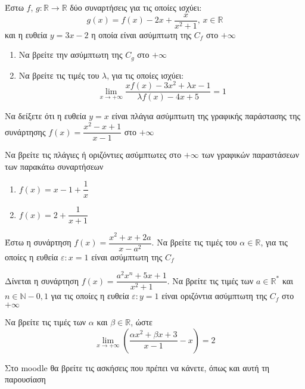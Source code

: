 \documentclass{presentation}
\begin{document}
\begin{askisi}
    Έστω $f$, $g:\mathbb{R}\to\mathbb{R}$ δύο συναρτήσεις για τις οποίες ισχύει:
    $$g(x)=f(x)-2x+\dfrac{x}{x^2+1} \text{, } x\in\mathbb{R}$$
    και η ευθεία $y=3x-2$ η οποία είναι ασύμπτωτη της $C_f$ στο $+\infty$
    \begin{enumerate}
        \item<1-> Να βρείτε την ασύμπτωτη της $C_g$ στο $+\infty$
        \item<2-> Να βρείτε τις τιμές του $λ$, για τις οποίες ισχύει:
            $$\lim\limits_{x \to +\infty}{ \dfrac{xf(x)-3x^2+λx-1}{λf(x)-4x+5} }=1$$
    \end{enumerate}

\end{askisi}

\begin{askisi}
    Να δείξετε ότι η ευθεία $y=x$ είναι πλάγια ασύμπτωτη της γραφικής παράστασης της συνάρτησης $f(x)=\dfrac{x^2-x+1}{x-1}$ στο $+\infty$

\end{askisi}

\begin{askisi}
    Να βρείτε τις πλάγιες ή οριζόντιες ασύμπτωτες στο $+\infty$ των γραφικών παραστάσεων των παρακάτω συναρτήσεων
    \begin{enumerate}
        \item<1-> $f(x)=x-1+\dfrac{1}{x}$
        \item<2-> $f(x)=2+\dfrac{1}{x+1}$
    \end{enumerate}

\end{askisi}

\begin{askisi}
    Έστω η συνάρτηση $f(x)=\dfrac{x^2+x+2a}{x-a^2}$. Να βρείτε τις τιμές του $α\in\mathbb{R}$, για τις οποίες η ευθεία $ε:x=1$ είναι ασύμπτωτη της $C_f$

\end{askisi}

\begin{askisi}
    Δίνεται η συνάρτηση $f(x)=\dfrac{a^2x^n+5x+1}{x^2+1}$. Να βρείτε τις τιμές των $a\in\mathbb{R}^*$ και $n\in\mathbb{N}-{0,1}$ για τις οποίες η ευθεία $ε:y=1$ είναι οριζόντια ασύμπτωτη της $C_f$ στο $+\infty$

\end{askisi}

\begin{askisi}
    Να βρείτε τις τιμές των $α$ και $β\in\mathbb{R}$, ώστε
    $$\lim\limits_{x \to +\infty}{ \left(   \dfrac{αx^2+βx+3}{x-1}-x \right)}=2$$

\end{askisi}

\begin{frame}
    Στο moodle θα βρείτε τις ασκήσεις που πρέπει να κάνετε, όπως και αυτή τη παρουσίαση
\end{frame}
\end{document}
